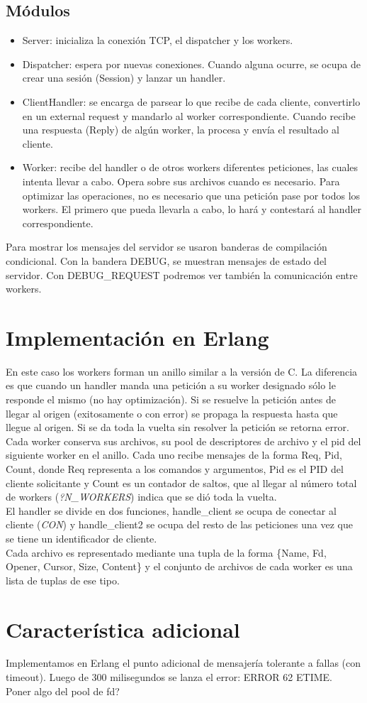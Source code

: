 \documentclass[a4paper,12pt]{article}
\begin{document}
    \subsection*{Módulos}
    \begin{itemize}
    \item Server: inicializa la conexión TCP, el dispatcher y los workers.
    \item Dispatcher: espera por nuevas conexiones. Cuando alguna ocurre, se ocupa de crear una sesión (Session) y lanzar un handler.
    \item ClientHandler: se encarga de parsear lo que recibe de cada cliente, convertirlo en un external request y mandarlo al worker correspondiente. Cuando recibe una respuesta (Reply) de algún worker, la procesa y envía el resultado al cliente.
    \item Worker: recibe del handler o de otros workers diferentes peticiones, las cuales intenta llevar a cabo. Opera sobre sus archivos cuando es necesario. Para optimizar las operaciones, no es necesario que una petición pase por todos los workers. El primero que pueda llevarla a cabo, lo hará y contestará al handler correspondiente.
    \end{itemize}
    Para mostrar los mensajes del servidor se usaron banderas de compilación condicional. Con la bandera DEBUG, se muestran mensajes de estado del servidor. Con DEBUG\_REQUEST podremos ver también la comunicación entre workers.
    
\section*{Implementación en Erlang}
    En este caso los workers forman un anillo similar a la versión de C. La diferencia es que cuando un handler manda una petición a su worker designado sólo le responde el mismo (no hay optimización). Si se resuelve la petición antes de llegar al origen (exitosamente o con error) se propaga la respuesta hasta que llegue al origen. Si se da toda la vuelta sin resolver la petición se retorna error.\\
    Cada worker conserva sus archivos, su pool de descriptores de archivo y el pid del siguiente worker en el anillo. Cada uno recibe mensajes de la forma {Req, Pid, Count}, donde Req representa a los comandos y argumentos, Pid es el PID del cliente solicitante y Count es un contador de saltos, que al llegar al número total de workers (\textit{?N\_WORKERS}) indica que se dió toda la vuelta.\\
    El handler se divide en dos funciones, handle\_client se ocupa de conectar al cliente (\textit{CON}) y handle\_client2 se ocupa del resto de las peticiones una vez que se tiene un identificador de cliente.\\
    Cada archivo es representado mediante una tupla de la forma \{Name, Fd, Opener, Cursor, Size, Content\} y el conjunto de archivos de cada worker es una lista de tuplas de ese tipo.

\section*{Característica adicional}
    Implementamos en Erlang el punto adicional de mensajería tolerante a fallas (con timeout). Luego de 300 milisegundos se lanza el error: ERROR 62 ETIME.\\
    
    Poner algo del pool de fd? 
\end{document}
